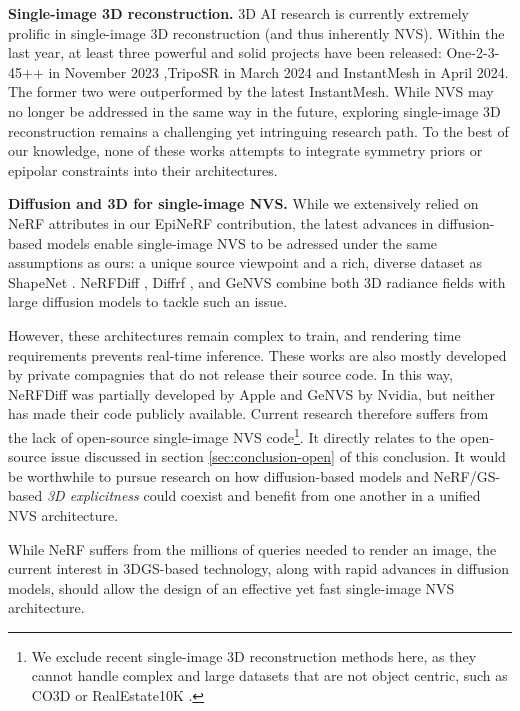 \noindent \textbf{Single-image 3D reconstruction.} 3D \ac{AI} research is currently extremely prolific in single-image 3D reconstruction (and thus inherently \ac{NVS}). Within the last year, at least three powerful and solid projects have been released:  One-2-3-45++ \citep{liu2023one2345++} in November 2023 ,TripoSR \citep{tochilkin2024triposr} in March 2024 and InstantMesh \citep{xu2024instantmesh} in April 2024. The former two were outperformed by the latest InstantMesh. While \ac{NVS} may no longer be addressed in the same way in the future, exploring single-image 3D reconstruction remains a challenging yet intringuing research path. To the best of our knowledge, none of these works attempts to integrate symmetry priors or epipolar constraints into their architectures. 

\noindent \textbf{Diffusion and 3D for single-image NVS.} While we extensively relied on \ac{NeRF} attributes in our EpiNeRF contribution, the latest advances in diffusion-based models enable single-image \ac{NVS} to be adressed under the same assumptions as ours: a unique source viewpoint and a rich, diverse dataset as ShapeNet \citep{chang2015shapenet}. NeRFDiff \citep{gu2023nerfdiff}, Diffrf \citep{muller2023diffrf}, and GeNVS \citep{chan2023genvs} combine both 3D radiance fields with large diffusion models to tackle such an issue. 

However, these architectures remain complex to train, and rendering time requirements prevents real-time inference. These works are also mostly developed by private compagnies that do not release their source code. In this way, NeRFDiff was partially developed by Apple and GeNVS by Nvidia, but neither has made their code publicly available. Current research therefore suffers from the lack of open-source single-image \ac{NVS} code\footnote{We exclude recent single-image 3D reconstruction methods here, as they cannot handle complex and large datasets that are not object centric, such as CO3D \citep{reizenstein2021common} or RealEstate10K \citep{zhou2018stereo}.}. It directly relates to the open-source issue discussed in section \ref{sec:conclusion-open} of this conclusion. It would be worthwhile to pursue research on how diffusion-based models and \ac{NeRF}/\ac{GS}-based \textit{3D explicitness} could coexist and benefit from one another in a unified \ac{NVS} architecture.

While \ac{NeRF} suffers from the millions of queries needed to render an image, the current interest in 3D\ac{GS}-based technology, along with rapid advances in diffusion models, should allow the design of an effective yet fast single-image \ac{NVS} architecture.

